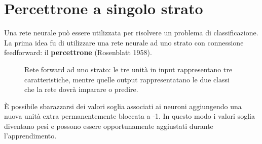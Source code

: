 \newpage

\section{Percettrone a singolo strato} %
\label{sec:percettrone_a_singolo_strato}
Una rete neurale può essere utilizzata per risolvere un problema di classificazione. La prima idea fu di utilizzare una rete neurale ad uno strato con connessione feedforward: il \textbf{percettrone} (Rosenblatt 1958).
\begin{figure}[h!]
    \centering
    \caption{Rete forward ad uno strato: le tre unità in input rappresentano tre caratteristiche, mentre quelle output rappresentatano le due classi che la rete dovrà imparare o predire.}
\end{figure}

È possibile sbarazzarsi dei valori soglia associati ai neuroni aggiungendo una nuova unità extra permanentemente bloccata a -1. In questo modo i valori soglia diventano pesi e possono essere opportunamente aggiustati durante l'apprendimento.


